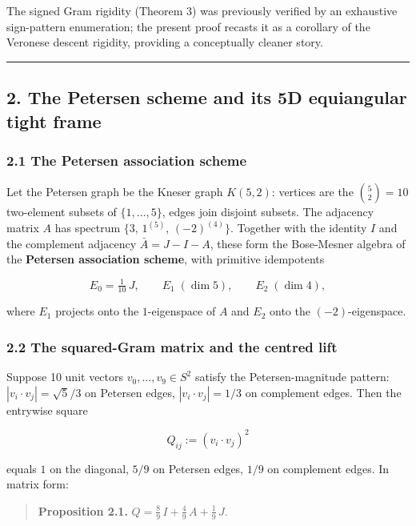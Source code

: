 \documentclass[
]{article}
\begin{document}
The signed Gram rigidity (Theorem 3) was previously verified by an
exhaustive sign-pattern enumeration; the present proof recasts it as a
corollary of the Veronese descent rigidity, providing a conceptually
cleaner story.

\begin{center}\rule{0.5\linewidth}{0.5pt}\end{center}

\subsection{2. The Petersen scheme and its 5D equiangular tight
frame}\label{the-petersen-scheme-and-its-5d-equiangular-tight-frame}

\subsubsection{2.1 The Petersen association
scheme}\label{the-petersen-association-scheme}

Let the Petersen graph be the Kneser graph \(K(5,2)\): vertices are the
\(\binom{5}{2} = 10\) two-element subsets of \(\{1,\dots,5\}\), edges
join disjoint subsets. The adjacency matrix \(A\) has spectrum
\(\{3,\,1^{(5)},\,(-2)^{(4)}\}\). Together with the identity \(I\) and
the complement adjacency \(\bar A = J - I - A\), these form the
Bose-Mesner algebra of the \textbf{Petersen association scheme}, with
primitive idempotents

\[
E_0 = \tfrac{1}{10}\,J,\qquad E_1 \;(\dim 5),\qquad E_2 \;(\dim 4),
\]

where \(E_1\) projects onto the \(1\)-eigenspace of \(A\) and \(E_2\)
onto the \((-2)\)-eigenspace.

\subsubsection{2.2 The squared-Gram matrix and the centred
lift}\label{the-squared-gram-matrix-and-the-centred-lift}

Suppose 10 unit vectors \(v_0,\ldots,v_9 \in S^2\) satisfy the
Petersen-magnitude pattern: \(|v_i\cdot v_j| = \sqrt{5}/3\) on Petersen
edges, \(|v_i\cdot v_j| = 1/3\) on complement edges. Then the entrywise
square

\[
Q_{ij} := (v_i\cdot v_j)^2
\]

equals \(1\) on the diagonal, \(5/9\) on Petersen edges, \(1/9\) on
complement edges. In matrix form:

\begin{quote}
\textbf{Proposition 2.1.}
\(Q = \tfrac{8}{9}\,I + \tfrac{4}{9}\,A + \tfrac{1}{9}\,J.\)
\end{quote}
\end{document}
